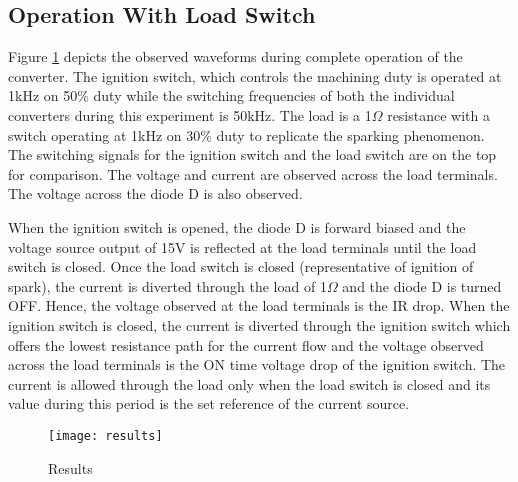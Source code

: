 \subsection{Operation With Load Switch}
	Figure \ref{fig:results} depicts the observed waveforms during complete operation of the converter. The ignition switch, which controls the machining duty is operated at 1kHz on 50\% duty while the switching frequencies of both the individual converters during this experiment is 50kHz. The load is a 1$\Omega$ resistance with a switch operating at 1kHz on 30\% duty to replicate the sparking phenomenon. The switching signals for the ignition switch and the load switch are on the top for comparison. The voltage and current are observed across the load terminals. The voltage across the diode D is also observed.
	
	When the ignition switch is opened, the diode D is forward biased and the voltage source output of 15V is reflected at the load terminals until the load switch is closed. Once the load switch is closed (representative of ignition of spark), the current is diverted through the load of 1$\Omega$ and the diode D is turned OFF. Hence, the voltage observed at the load terminals is the IR drop. When the ignition switch is closed, the current is diverted through the ignition switch which offers the lowest resistance path for the current flow and the voltage observed across the load terminals is the ON time voltage drop of the ignition switch. The current is allowed through the load only when the load switch is closed and its value during this period is the set reference of the current source.

	\begin{figure}[H]
		\centering
		\texttt{[image: results]}
		\caption{Results}
		\label{fig:results}
	\end{figure}

	\begin{comment}
		\begin{figure}[H]
			\centering
			\texttt{[image: results2]}
			\caption{Hardware results for operation under switched R load}
			\label{fig:results2}
		\end{figure}
		The entire operation of the proposed converter relies on the fact that the voltage source output will appear across the spark gap terminals when the diode D is ON. To verify this, the above experiment has been run at the machining frequency of 100Hz to observer the behaviour of the converter under larger disturbance. It is observed that the load voltage follows the voltage source output when the D is ON. This is shown in figure \ref{fig:results2}.
	\end{comment}
	
